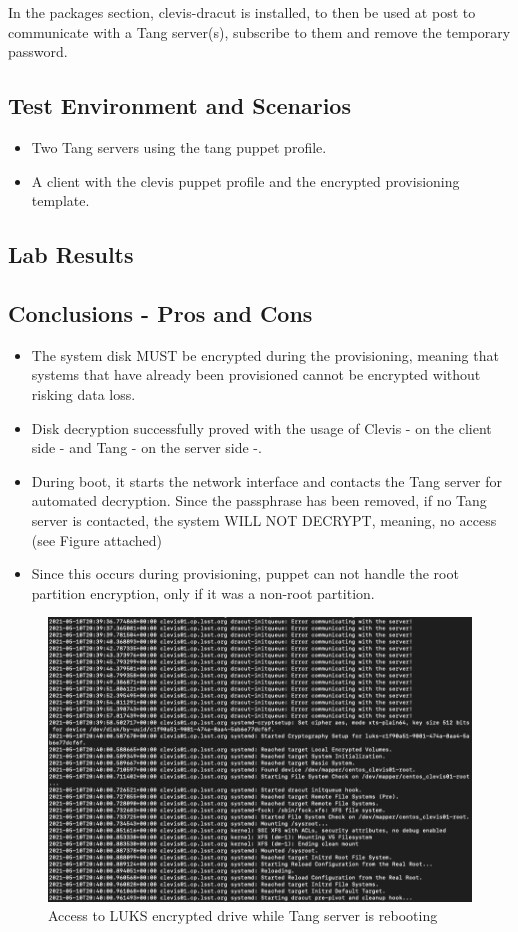 In the packages section, clevis-dracut is installed, to then be used at post to communicate with a Tang server(s), subscribe to them and remove the temporary password.

\newpage
\subsection{Test Environment and Scenarios}
\begin{itemize}
  \item Two Tang servers using the tang puppet profile.
  \item A client with the clevis puppet profile and the encrypted provisioning template.
\end{itemize}
\subsection{Lab Results}

\newpage
\subsection{Conclusions - Pros and Cons}
\begin{itemize}
  \item The system disk MUST be encrypted during the provisioning, meaning that systems that have already been provisioned cannot be encrypted without risking data loss.
  \item Disk decryption successfully proved with the usage of Clevis - on the client side - and Tang - on the server side -. 
  \item During boot, it starts the network interface and contacts the Tang server for automated decryption. Since the passphrase has been removed, if no Tang server is contacted, the system WILL NOT DECRYPT, meaning, no access (see Figure attached)
  \item Since this occurs during provisioning, puppet can not handle the root partition encryption, only if it was a non-root partition.
\end{itemize}

\begin{figure}
  \includegraphics[width=14cm]{images/image1.png}
  \centering
  \caption{Access to LUKS encrypted drive while Tang server is rebooting}
\end{figure}

\newpage